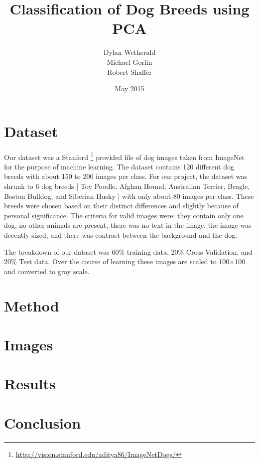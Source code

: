 \documentclass[a4paper, 12pt]{article}
\title{Classification of Dog Breeds using PCA}
\author{Dylan Wetherald\\Michael Gorlin\\Robert Shaffer}
\date{May 2015}
\begin{document}
\maketitle

\section*{Dataset}
Our dataset was a Stanford \footnote{\url{http://vision.stanford.edu/aditya86/ImageNetDogs/}}
provided file of dog images taken from ImageNet for the purpose of machine learning.
The dataset contains 120 different dog breeds with about 150 to 200 images per class. For
our project, the dataset was shrunk to 6 dog breeds | Toy Poodle, Afghan Hound, Australian
Terrier, Beagle, Boston Bulldog, and Siberian Husky | with only about 80 images per class. 
These breeds were chosen based on their distinct differences and slightly because of
personal significance. The criteria for valid images were: they contain only one dog, no
other animals are present, there was no text in the image, the image was decently sized, and 
there was contrast between the background and the dog.

The breakdown of our dataset was 60\% training data, 20\% Cross Validation, and 20\% Test data.
Over the course of learning these images are scaled to 100$\times$100 and converted to gray 
scale.
\section*{Method}
\section*{Images}
\section*{Results}
\section*{Conclusion}
\end{document}
